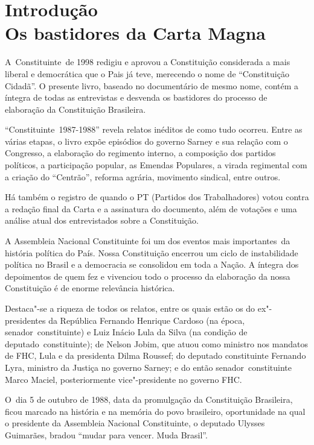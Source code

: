 \chapter{Introdução\\
Os bastidores da Carta Magna}

A~Constituinte~de 1998 redigiu e aprovou a Constituição considerada a
mais liberal e democrática que o Pais já teve, merecendo o nome de
``Constituição Cidadã''. O presente livro, baseado no documentário de
mesmo nome, contém a íntegra de todas as entrevistas e desvenda os
bastidores do processo de elaboração da Constituição Brasileira.

``Constituinte~1987-1988'' revela relatos inéditos de como tudo ocorreu.
Entre as várias etapas, o livro expõe episódios do governo Sarney e sua
relação com o Congresso, a elaboração do regimento interno, a composição
dos partidos políticos, a participação popular, as Emendas Populares, a
virada regimental com a criação do ``Centrão'', reforma agrária,
movimento sindical, entre outros.

Há também o registro de quando o PT (Partidos dos Trabalhadores) votou
contra a redação final da Carta e a assinatura do documento, além de
votações e uma análise atual dos entrevistados sobre a Constituição.

A Assembleia Nacional Constituinte foi um dos eventos mais
importantes~da história política do País. Nossa Constituição encerrou um
ciclo de instabilidade política no Brasil e a democracia se consolidou
em toda a Nação. A íntegra dos depoimentos de quem fez e vivenciou todo
o processo da elaboração da nossa Constituição é de enorme relevância
histórica.

Destaca"-se a riqueza de todos os relatos, entre os quais estão os do
ex"-presidentes da República Fernando Henrique Cardoso (na época,
senador~constituinte) e Luiz Inácio Lula da Silva (na condição de
deputado~constituinte); de Nelson Jobim, que atuou como ministro nos
mandatos de FHC, Lula e da presidenta Dilma Roussef; do deputado
constituinte Fernando Lyra, ministro da Justiça no governo Sarney; e do
então senador~constituinte Marco Maciel, posteriormente vice"-presidente
no governo FHC.~

O~dia 5 de outubro de 1988, data da promulgação da Constituição
Brasileira, ficou marcado na história e na memória do povo brasileiro,
oportunidade na qual o presidente da Assembleia Nacional Constituinte, o
deputado Ulysses Guimarães, bradou ``mudar para vencer. Muda Brasil''.


